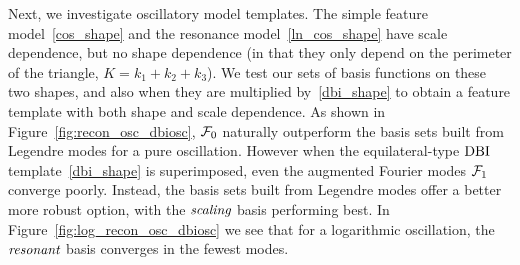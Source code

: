 Next, we investigate oscillatory model templates.
The simple feature model~\eqref{cos_shape} and the resonance model~\eqref{ln_cos_shape}
have scale dependence, but no shape dependence (in that they only depend on the perimeter
of the triangle, $K=k_1+k_2+k_3$).
We test our sets of basis functions on these two shapes,
and also when they are multiplied by~\eqref{dbi_shape} to obtain a feature
template with both shape and scale dependence.
As shown in Figure~\ref{fig:recon_osc_dbiosc},
$\mathcal{F}_0$ naturally outperform the basis sets built from Legendre modes for a pure oscillation.
However when the equilateral-type $\text{DBI}$ template~\eqref{dbi_shape} is superimposed, even the augmented Fourier modes
$\mathcal{F}_1$ converge poorly. Instead, the basis sets built from Legendre modes offer a better more robust option,
with the $\textit{scaling}$ basis performing best.
In Figure~\ref{fig:log_recon_osc_dbiosc} we see that for a logarithmic
oscillation, the $\textit{resonant}$ basis converges in the fewest modes.



